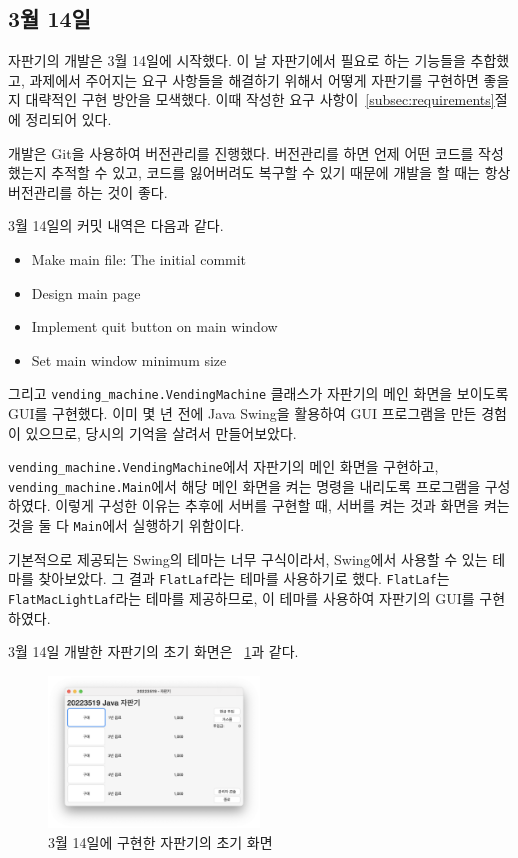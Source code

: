 \documentclass{oblivoir}
\newcommand{\figref}[1]{\figurename~\ref{#1}}
\begin{document}
    \subsection{3월 14일}\label{subsec:3-14}

    자판기의 개발은 3월 14일에 시작했다.
    이 날 자판기에서 필요로 하는 기능들을 추합했고,
    과제에서 주어지는 요구 사항들을 해결하기 위해서 어떻게 자판기를 구현하면 좋을지 대략적인 구현 방안을 모색했다.
    이때 작성한 요구 사항이~\ref{subsec:requirements}절에 정리되어 있다.

    개발은 Git을 사용하여 버전관리를 진행했다.
    버전관리를 하면 언제 어떤 코드를 작성했는지 추적할 수 있고, 코드를 잃어버려도 복구할 수 있기 때문에
    개발을 할 때는 항상 버전관리를 하는 것이 좋다.

    3월 14일의 커밋 내역은 다음과 같다.
    \begin{itemize}
        \item Make main file: The initial commit
        \item Design main page
        \item Implement quit button on main window
        \item Set main window minimum size
    \end{itemize}

    그리고 \texttt{vending\_machine.VendingMachine} 클래스가 자판기의 메인 화면을 보이도록 GUI를 구현했다.
    이미 몇 년 전에 Java Swing을 활용하여 GUI 프로그램을 만든 경험이 있으므로,
    당시의 기억을 살려서 만들어보았다.

    \texttt{vending\_machine.VendingMachine}에서 자판기의 메인 화면을 구현하고,
    \texttt{vending\_machine.Main}에서 해당 메인 화면을 켜는 명령을 내리도록 프로그램을 구성하였다.
    이렇게 구성한 이유는 추후에 서버를 구현할 때,
    서버를 켜는 것과 화면을 켜는 것을 둘 다 \texttt{Main}에서 실행하기 위함이다.

    기본적으로 제공되는 Swing의 테마는 너무 구식이라서, Swing에서 사용할 수 있는 테마를 찾아보았다.
    그 결과 \texttt{FlatLaf}라는 테마를 사용하기로 했다.
    \texttt{FlatLaf}는 \texttt{FlatMacLightLaf}라는 테마를 제공하므로,
    이 테마를 사용하여 자판기의 GUI를 구현하였다.

    3월 14일 개발한 자판기의 초기 화면은 \figref{fig:0314-vending-machine}과 같다.
    \begin{figure}[h]
        \centering
        \includegraphics[width=0.5\textwidth]{images/dev-snapshop/0314-vending-machine}
        \caption{3월 14일에 구현한 자판기의 초기 화면}
        \label{fig:0314-vending-machine}
    \end{figure}
\end{document}
